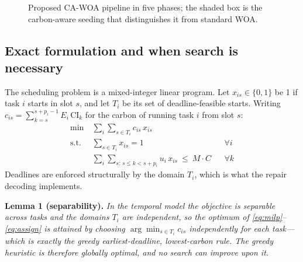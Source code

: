 \documentclass[12pt,a4paper]{article}
\begin{document}
\begin{figure}[H]\centering
{}
\caption{Proposed CA-WOA pipeline in five phases; the shaded box is the carbon-aware seeding that distinguishes it from standard WOA.}\label{fig:cawoa}
\end{figure}

\subsection{Exact formulation and when search is necessary}\label{sec:milp}
The scheduling problem is a mixed-integer linear program. Let $x_{is}\in\{0,1\}$ be 1 if task $i$ starts in
slot $s$, and let $T_i$ be its set of deadline-feasible starts. Writing
$c_{is}=\sum_{k=s}^{s+p_i-1}E_i\,\mathrm{CI}_k$ for the carbon of running task $i$ from slot $s$:
\begin{align}
\min\ & \textstyle\sum_i\sum_{s\in T_i} c_{is}\,x_{is} \label{eq:milp}\\
\text{s.t.}\ & \textstyle\sum_{s\in T_i} x_{is}=1 && \forall i \label{eq:assign}\\
& \textstyle\sum_i\sum_{s:\,s\le k<s+p_i} u_i\,x_{is}\ \le\ M\!\cdot\!C && \forall k \label{eq:cap}
\end{align}
Deadlines are enforced structurally by the domain $T_i$, which is what the repair decoding implements.

\vspace{2pt}\noindent\textbf{Lemma 1 (separability).} \emph{In the temporal model the objective is separable
across tasks and the domains $T_i$ are independent, so the optimum of \eqref{eq:milp}--\eqref{eq:assign} is
attained by choosing $\arg\min_{s\in T_i}c_{is}$ independently for each task---which is exactly the greedy
earliest-deadline, lowest-carbon rule. The greedy heuristic is therefore globally optimal, and no search can
improve upon it.}
\end{document}
